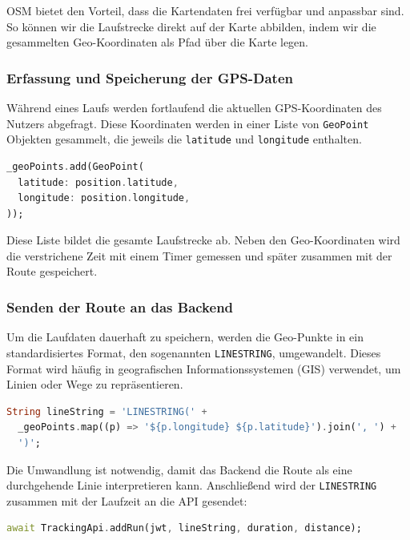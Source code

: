 \documentclass[11pt,a4paper]{article}
\begin{document}
OSM bietet den Vorteil, dass die Kartendaten frei verfügbar und anpassbar sind. So können wir die Laufstrecke direkt auf der Karte abbilden, indem wir die gesammelten Geo-Koordinaten als Pfad über die Karte legen.

\subsubsection{Erfassung und Speicherung der GPS-Daten}

Während eines Laufs werden fortlaufend die aktuellen GPS-Koordinaten des Nutzers abgefragt. Diese Koordinaten werden in einer Liste von \texttt{GeoPoint} Objekten gesammelt, die jeweils die \texttt{latitude} und \texttt{longitude} enthalten.

\begin{lstlisting}[language=Dart, caption=Hinzufügen eines GeoPoints zur Route]
_geoPoints.add(GeoPoint(
  latitude: position.latitude,
  longitude: position.longitude,
));
\end{lstlisting}

Diese Liste bildet die gesamte Laufstrecke ab. Neben den Geo-Koordinaten wird die verstrichene Zeit mit einem Timer gemessen und später zusammen mit der Route gespeichert.

\subsubsection{Senden der Route an das Backend}

Um die Laufdaten dauerhaft zu speichern, werden die Geo-Punkte in ein standardisiertes Format, den sogenannten \texttt{LINESTRING}, umgewandelt. Dieses Format wird häufig in geografischen Informationssystemen (GIS) verwendet, um Linien oder Wege zu repräsentieren.

\begin{lstlisting}[language=Dart, caption=Erzeugen eines LINESTRINGs]
String lineString = 'LINESTRING(' +
  _geoPoints.map((p) => '${p.longitude} ${p.latitude}').join(', ') +
  ')';
\end{lstlisting}

Die Umwandlung ist notwendig, damit das Backend die Route als eine durchgehende Linie interpretieren kann. Anschließend wird der \texttt{LINESTRING} zusammen mit der Laufzeit an die API gesendet:

\begin{lstlisting}[language=Dart, caption=Senden der Laufdaten ans Backend]
await TrackingApi.addRun(jwt, lineString, duration, distance);
\end{lstlisting}
\end{document}
